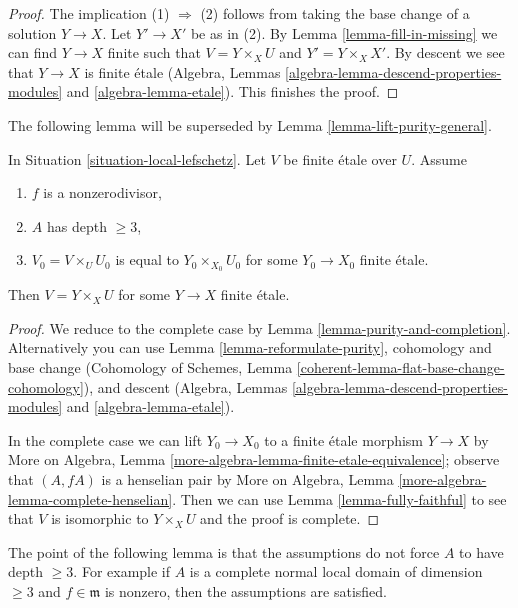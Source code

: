 \begin{proof}
The implication (1) $\Rightarrow$ (2) follows from taking the base change
of a solution $Y \to X$. Let $Y' \to X'$ be as in (2).
By Lemma \ref{lemma-fill-in-missing} we can find $Y \to X$ finite
such that $V = Y \times_X U$ and $Y' = Y \times_X X'$.
By descent we see that $Y \to X$ is finite \'etale
(Algebra, Lemmas \ref{algebra-lemma-descend-properties-modules} and
\ref{algebra-lemma-etale}). This finishes the proof.
\end{proof}

\noindent
The following lemma will be superseded by
Lemma \ref{lemma-lift-purity-general}.

\begin{lemma}
\label{lemma-lift-purity}
In Situation \ref{situation-local-lefschetz}.
Let $V$ be finite \'etale over $U$. Assume
\begin{enumerate}
\item $f$ is a nonzerodivisor,
\item $A$ has depth $\geq 3$,
\item $V_0 = V \times_U U_0$ is equal to $Y_0 \times_{X_0} U_0$
for some $Y_0 \to X_0$ finite \'etale.
\end{enumerate}
Then $V = Y \times_X U$ for some $Y \to X$ finite \'etale.
\end{lemma}

\begin{proof}
We reduce to the complete case by Lemma \ref{lemma-purity-and-completion}.
Alternatively you can use Lemma \ref{lemma-reformulate-purity},
cohomology and base change
(Cohomology of Schemes, Lemma
\ref{coherent-lemma-flat-base-change-cohomology}), and descent
(Algebra, Lemmas \ref{algebra-lemma-descend-properties-modules} and
\ref{algebra-lemma-etale}).

\medskip\noindent
In the complete case we can lift $Y_0 \to X_0$ to a finite
\'etale morphism $Y \to X$ by
More on Algebra, Lemma \ref{more-algebra-lemma-finite-etale-equivalence};
observe that $(A, fA)$ is a henselian pair by
More on Algebra, Lemma \ref{more-algebra-lemma-complete-henselian}.
Then we can use Lemma \ref{lemma-fully-faithful}
to see that $V$ is isomorphic to $Y \times_X U$ and
the proof is complete.
\end{proof}

\noindent
The point of the following lemma is that the assumptions do not force
$A$ to have depth $\geq 3$. For example if $A$ is a complete normal
local domain of dimension $\geq 3$ and $f \in \mathfrak m$ is nonzero,
then the assumptions are satisfied.

